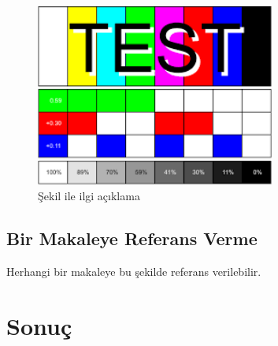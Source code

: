 \documentclass[12pt, a4paper]{article}
\begin{document}
\begin{figure}[h!]
 	\centering
	\shorthandoff{=}
      \includegraphics[width=0.7\textwidth]{Test.png}
	\caption{\label{fig:test}Şekil ile ilgi açıklama}
\end{figure}

\subsection{Bir Makaleye Referans Verme}
Herhangi bir makaleye \cite{als} bu şekilde referans verilebilir.

\newpage
\section{Sonuç}

\newpage
{}
%


\end{document}
